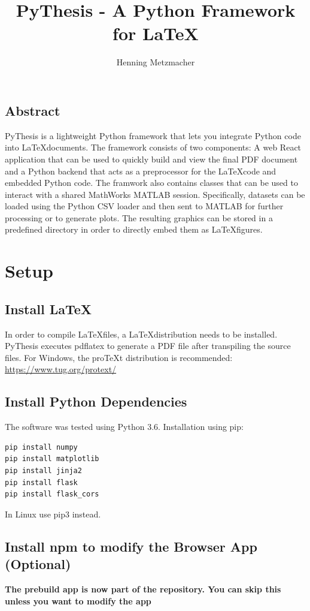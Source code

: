 \documentclass[a4paper]{book}
\title{PyThesis - A Python Framework for \LaTeX}
\author{Henning Metzmacher}
\begin{document}
\maketitle
\clearpage
\thispagestyle{empty}
\section*{Abstract}
PyThesis is a lightweight Python framework that lets you integrate Python code into \LaTeX documents. The framework consists of two components: A web React application that can be used to quickly build and view the final PDF document and a Python backend that acts as a preprocessor for the \LaTeX code and embedded Python code. The framwork also contains classes that can be used to interact with a shared MathWorks MATLAB session. Specifically, datasets can be loaded using the Python CSV loader and then sent to MATLAB for further processing or to generate plots. The resulting graphics can be stored in a predefined directory in order to directly embed them as \LaTeX figures.
\clearpage
\tableofcontents
\chapter{Setup}
\label{ch:setup}
\section{Install \LaTeX}
In order to compile \LaTeX files, a \LaTeX distribution needs to be installed. PyThesis executes pdflatex to generate a PDF file after transpiling the source files. For Windows, the proTeXt distribution is recommended: \url{https://www.tug.org/protext/}

\section{Install Python Dependencies}
The software was tested using Python 3.6. Installation using pip: 
\begin{verbatim}
pip install numpy
pip install matplotlib
pip install jinja2
pip install flask
pip install flask_cors
\end{verbatim}
In Linux use pip3 instead.
\section{Install npm to modify the Browser App (Optional)}

\textbf{The prebuild app is now part of the repository. You can skip this unless you want to modify the app}
\end{document}
